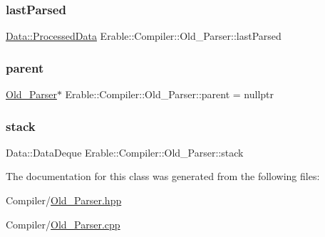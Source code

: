 \subsubsection{\texorpdfstring{lastParsed}{lastParsed}}
{\footnotesize\ttfamily \mbox{\hyperlink{struct_erable_1_1_compiler_1_1_data_1_1_processed_data}{Data\+::\+Processed\+Data}} Erable\+::\+Compiler\+::\+Old\+\_\+\+Parser\+::last\+Parsed\hspace{0.3cm}{\ttfamily [private]}}

\mbox{\label{class_erable_1_1_compiler_1_1_old___parser_a8295ed96c8f71b828024e97fe0da88aa}} 
\subsubsection{\texorpdfstring{parent}{parent}}
{\footnotesize\ttfamily \mbox{\hyperlink{class_erable_1_1_compiler_1_1_old___parser}{Old\+\_\+\+Parser}}$\ast$ Erable\+::\+Compiler\+::\+Old\+\_\+\+Parser\+::parent = nullptr\hspace{0.3cm}{\ttfamily [private]}}

\mbox{\label{class_erable_1_1_compiler_1_1_old___parser_aa739607e8e8a9aa93aba91a0719ca17e}} 
\subsubsection{\texorpdfstring{stack}{stack}}
{\footnotesize\ttfamily Data\+::\+Data\+Deque Erable\+::\+Compiler\+::\+Old\+\_\+\+Parser\+::stack\hspace{0.3cm}{\ttfamily [private]}}



The documentation for this class was generated from the following files\+:\begin{DoxyCompactItemize}
\item 
Compiler/\mbox{\hyperlink{_old___parser_8hpp}{Old\+\_\+\+Parser.\+hpp}}\item 
Compiler/\mbox{\hyperlink{_old___parser_8cpp}{Old\+\_\+\+Parser.\+cpp}}\end{DoxyCompactItemize}
